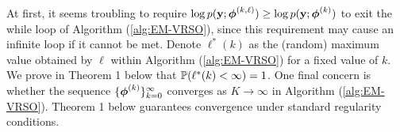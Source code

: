 At first, it seems troubling to require $\log p(\mathbf{y};\boldsymbol{\phi}^{(k,\ell)}) \geq \log p(\mathbf{y};\boldsymbol{\phi}^{(k)})$ to exit the while loop of Algorithm (\ref{alg:EM-VRSO}), since this requirement may cause an infinite loop if it cannot be met. %
Denote $\ell^*(k)$ as the (random) maximum value obtained by $\ell$ within Algorithm (\ref{alg:EM-VRSO}) for a fixed value of $k$. We prove in Theorem 1 below that 
$\mathbb{P}(\ell^*(k) < \infty) = 1$. %
%
One final concern is whether the sequence $\{\boldsymbol{\phi}^{(k)}\}_{k=0}^\infty$ converges as $K \to \infty$ in Algorithm (\ref{alg:EM-VRSO}). %
Theorem 1 below guarantees convergence under standard regularity conditions. %

    
